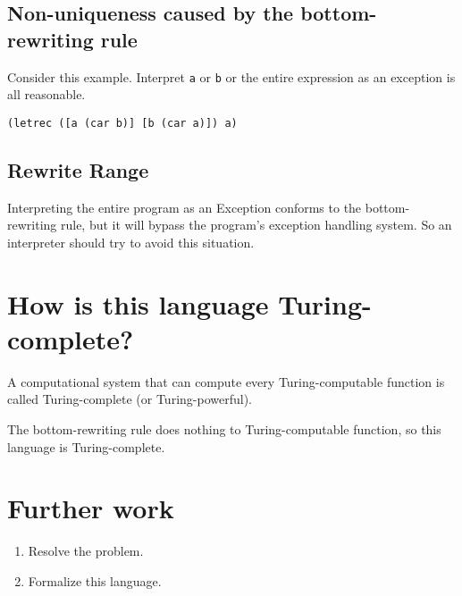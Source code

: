 \documentclass[11pt,preprint,numbers]{sigplanconf}
\begin{document}
\subsection{Non-uniqueness caused by the bottom-rewriting rule}

Consider this example. Interpret {\scriptsize\verb|a|} or {\scriptsize\verb|b|} or the entire expression as an exception is all reasonable.
\lstset{language=Lisp}
\begin{lstlisting}[frame=single]
(letrec ([a (car b)] [b (car a)]) a)
\end{lstlisting}

\subsection{Rewrite Range}

Interpreting the entire program as an Exception conforms to the bottom-rewriting rule, but it will bypass the program's exception handling system. So an interpreter should try to avoid this situation.

\section{How is this language Turing-complete?}

A computational system that can compute every Turing-computable function is called Turing-complete (or Turing-powerful).~\citep{wikipedia_Turing_completeness}

The bottom-rewriting rule does nothing to Turing-computable function, so this language is Turing-complete.

\section{Further work}

\begin{enumerate}
\item Resolve the problem.
\item Formalize this language.
\end{enumerate}



\end{document}
